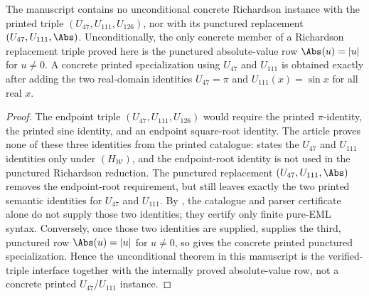\begin{corollary}
\label{cor:no-unconditional-printed-richardson-triple}
\label{thm:no-unconditional-concrete-eml-richardson-instance}
The manuscript contains no unconditional concrete Richardson instance with the
printed triple \((U_{47},U_{111},U_{126})\), nor with its punctured replacement
\((U_{47},U_{111},\Abs)\).  Unconditionally, the only concrete member of a
Richardson replacement triple proved here is the punctured absolute-value row
\(\Abs(u)=|u|\) for \(u\ne0\).  A concrete printed specialization using
\(U_{47}\) and \(U_{111}\) is obtained exactly after adding the two real-domain
identities \(U_{47}=\pi\) and \(U_{111}(x)=\sin x\) for all real \(x\).
\end{corollary}

\begin{proof}
The endpoint triple \((U_{47},U_{111},U_{126})\) would require the printed
\(\pi\)-identity, the printed sine identity, and an endpoint square-root identity.
The article proves none of these three identities from the printed catalogue:
 states the \(U_{47}\) and \(U_{111}\) identities
only under \((H_{\mathcal W})\), and the endpoint-root identity is not used in the
punctured Richardson reduction.  The punctured replacement
\((U_{47},U_{111},\Abs)\) removes the endpoint-root requirement, but still leaves
exactly the two printed semantic identities for \(U_{47}\) and \(U_{111}\).
By , the catalogue and parser
certificate alone do not supply those two identities; they certify only finite
pure-EML syntax.  Conversely, once those two identities are supplied,
 supplies the third, punctured row
\(\Abs(u)=|u|\) for \(u\ne0\), so
 gives the concrete printed
punctured specialization.  Hence the unconditional theorem in this manuscript is
the verified-triple interface together with the internally proved absolute-value
row, not a concrete printed \(U_{47}\)/\(U_{111}\) instance.
\end{proof}
